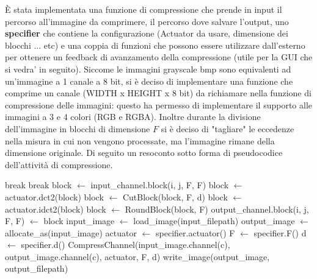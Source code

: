 \documentclass[a4paper,11pt,oneside, table]{article}
\begin{document}
\`E stata implementata una funzione di compressione che prende in input il percorso all'immagine da comprimere, il percorso dove salvare l'output, uno \textbf{specifier} che contiene la configurazione (Actuator da usare, dimensione dei blocchi ... etc) e una coppia di funzioni che possono essere utilizzare dall'esterno per ottenere un feedback di avanzamento della compressione (utile per la GUI che si vedra' in seguito).
Siccome le immagini grayscale bmp sono equivalenti ad un'immagine a 1 canale a 8 bit, si \`e deciso di implementare una funzione che comprime un canale (WIDTH x HEIGHT x 8 bit) da richiamare nella funzione di compressione delle immagini: questo ha permesso di implementare il supporto alle immagini a 3 e 4 colori (RGB e RGBA).
Inoltre durante la divisione dell'immagine in blocchi di dimensione $F$ si \`e deciso di "tagliare" le eccedenze nella misura in cui non vengono processate, ma l'immagine rimane della dimensione originale.
Di seguito un resoconto sotto forma di pseudocodice dell'attivit\`a di compressione.

\begin{algorithm}
  \renewcommand\thealgorithm{}
  \caption{Algoritmo di Compressione}
  \begin{algorithmic}
          \State break
        \EndIf
            \State break
          \EndIf
          \State block $\gets$ input\_channel.block(i, j, F, F)
          \State block $\gets$ actuator.dct2(block)
          \State block $\gets$ CutBlock(block, F, d)
          \State block $\gets$ actuator.idct2(block)
          \State block $\gets$ RoundBlock(block, F)
          \State output\_channel.block(i, j, F, F) $\gets$ block
        \EndFor
      \EndFor
    \EndProcedure
      \State input\_image $\gets$ load\_image(input\_filepath)
      \State output\_image $\gets$ allocate\_as(input\_image)
      \State actuator $\gets$ specifier.actuator()
      \State F $\gets$ specifier.F()
      \State d $\gets$ specifier.d()
        \State CompressChannel(input\_image.channel(c), output\_image.channel(c), actuator, F, d)
      \EndFor
      \State write\_image(output\_image, output\_filepath)
    \EndProcedure
  \end{algorithmic}
\end{algorithm}
\end{document}
